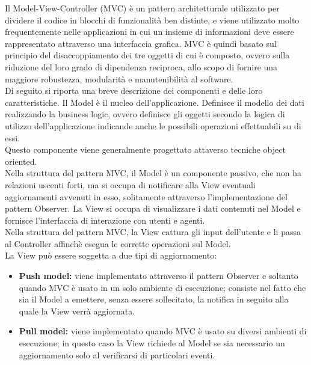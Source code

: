  \label{app:designpattern}
	 \label{app:MVC}
		Il Model-View-Controller (MVC) è un pattern architetturale utilizzato per dividere il codice in blocchi di funzionalità ben distinte, e viene utilizzato molto frequentemente nelle applicazioni in cui un insieme di informazioni deve essere rappresentato attraverso una interfaccia grafica.
			MVC è quindi basato sul principio del disaccoppiamento dei tre oggetti di cui è composto, ovvero sulla riduzione del loro grado di dipendenza reciproca, allo scopo di fornire una maggiore robustezza, modularità e manutenibilità al software.\\
			Di seguito si riporta una breve descrizione dei componenti e delle loro caratteristiche. 
				Il Model è il nucleo dell'applicazione. Definisce il modello dei dati realizzando la business logic, ovvero definisce gli oggetti secondo la logica di utilizzo dell'applicazione indicande anche le possibili operazioni effettuabili su di essi.\\
				Questo componente viene generalmente progettato attaverso tecniche object oriented.\\
				Nella struttura del pattern MVC, il Model è un componente passivo, che non ha relazioni uscenti forti, ma si occupa di notificare alla View eventuali aggiornamenti avvenuti in esso, solitamente attraverso l'implementazione del pattern Observer.
				La View si occupa di visualizzare i dati contenuti nel Model e fornisce l'interfaccia di interazione con utenti e agenti.\\
				Nella struttura del pattern MVC, la View cattura gli input dell'utente e li passa al Controller affinchè esegua le corrette operazioni sul Model. \\
				La View può essere soggetta a due tipi di aggiornamento:
				\begin{itemize}
					\item \textbf{Push model:} viene implementato attraverso il pattern Observer e soltanto quando MVC è usato in un solo ambiente di esecuzione; consiste nel fatto che sia il Model a emettere, senza essere sollecitato, la notifica in seguito alla quale la View verrà aggiornata.
					\item \textbf{Pull model:} viene implementato quando MVC è usato su diversi ambienti di esecuzione; in questo caso la View richiede al Model se sia necessario un aggiornamento solo al verificarsi di particolari eventi.
				\end{itemize}
